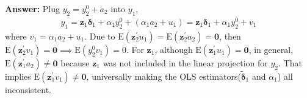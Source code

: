 \documentclass[UTF8]{article} %
\begin{document}
\begin{enumerate}
    \textbf{Answer:} Plug $y_2=y_2^0+a_2$ into $y_1$,
    \begin{gather}
        y_{1}=\mathbf{z}_{1} \boldsymbol{\delta}_{1}+\alpha_{1} y_{2}^0+\left(\alpha_1 a_2 + u_{1}\right) = \mathbf{z}_{1} \boldsymbol{\delta}_{1}+\alpha_{1} y_{2}^0+v_1 \label{eq:5.11-1}
    \end{gather}
    where $v_1 = \alpha_1 a_2 + u_{1}$. Due to $\mathrm{E}(\mathbf{z}_2^\prime u_1) = \mathrm{E}(\mathbf{z}_2^\prime a_2) = \mathbf{0}$, then $\mathrm{E}(\mathbf{z}_2^\prime v_1) = \mathbf{0} \implies \mathrm{E}(y_2^0 v_1) = 0$. For $\mathbf{z}_1$, although $\mathrm{E}(\mathbf{z}_1^\prime u_1) = \mathbf{0}$, in general, $\mathrm{E}(\mathbf{z}_1^\prime a_2) \neq \mathbf{0}$ because $\mathbf{z}_1$ was not included in the linear projection for $y_2$. That implies $\mathrm{E}(\mathbf{z}_1^\prime v_1) \neq \mathbf{0}$, universally making the OLS estimators($\tilde{\bm{\delta}}_1$ and $\alpha_1$) all inconsistent.
    
    
    
    
    
    
    
    
    
    




\end{enumerate}
\end{document}
